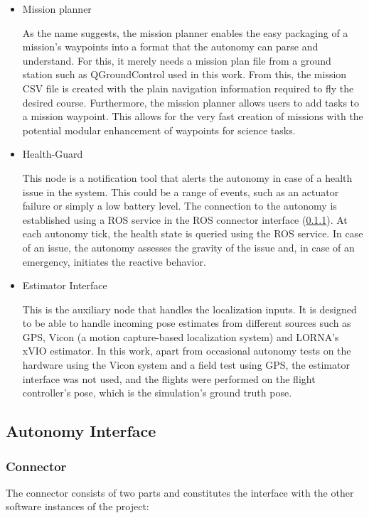 \documentclass{article}
\begin{document}
\begin{itemize}
    \item Mission planner

    As the name suggests, the mission planner enables the easy packaging of a mission's waypoints into a format that the autonomy can parse and understand. For this, it merely needs a mission plan file from a ground station such as QGroundControl used in this work. From this, the mission CSV file is created with the plain navigation information required to fly the desired course. Furthermore, the mission planner allows users to add tasks to a mission waypoint. This allows for the very fast creation of missions with the potential modular enhancement of waypoints for science tasks.
    \item Health-Guard
    
    This node is a notification tool that alerts the autonomy in case of a health issue in the system. This could be a range of events, such as an actuator failure or simply a low battery level. The connection to the autonomy is established using a ROS service in the ROS connector interface (\ref{subsubsec:connector}). At each autonomy tick, the health state is queried using the ROS service. In case of an issue, the autonomy assesses the gravity of the issue and, in case of an emergency, initiates the reactive behavior.

    \item Estimator Interface
    
    This is the auxiliary node that handles the localization inputs. It is designed to be able to handle incoming pose estimates from different sources such as GPS, Vicon (a motion capture-based localization system) and LORNA's xVIO estimator. In this work, apart from occasional autonomy tests on the hardware using the Vicon system and a field test using GPS, the estimator interface was not used, and the flights were performed on the flight controller's pose, which is the simulation's ground truth pose.
\end{itemize}

\subsection{Autonomy Interface}
\subsubsection{Connector}\label{subsubsec:connector}

The connector consists of two parts and constitutes the interface with the other software instances of the project:
\end{document}
